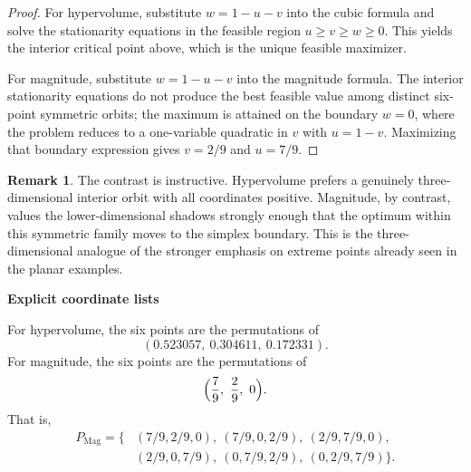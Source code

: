 \documentclass{article}
\theoremstyle{definition}
\newtheorem{remark}[theorem]{Remark}
\newcommand{\1}{\mathbf{1}}
\newcommand{\myparagraph}[1]{\medskip\noindent\textbf{#1}}
\begin{document}
\begin{proof}
For hypervolume, substitute $w=1-u-v$ into the cubic formula and solve the stationarity equations in the feasible region $u\ge v\ge w\ge 0$. This yields the interior critical point above, which is the unique feasible maximizer.

For magnitude, substitute $w=1-u-v$ into the magnitude formula. The interior stationarity equations do not produce the best feasible value among distinct six-point symmetric orbits; the maximum is attained on the boundary $w=0$, where the problem reduces to a one-variable quadratic in $v$ with $u=1-v$. Maximizing that boundary expression gives $v=2/9$ and $u=7/9$.
\end{proof}

\begin{remark}
The contrast is instructive. Hypervolume prefers a genuinely three-dimensional interior orbit with all coordinates positive. Magnitude, by contrast, values the lower-dimensional shadows strongly enough that the optimum within this symmetric family moves to the simplex boundary. This is the three-dimensional analogue of the stronger emphasis on extreme points already seen in the planar examples.
\end{remark}

\myparagraph{Explicit coordinate lists}

For hypervolume, the six points are the permutations of
\[
(0.523057,\ 0.304611,\ 0.172331).
\]
For magnitude, the six points are the permutations of
\[
\Bigl(\frac79,\ \frac29,\ 0\Bigr).
\]
That is,
\[
\begin{aligned}
P_{\mathrm{Mag}}=\{&
(7/9,2/9,0),\ (7/9,0,2/9),\ (2/9,7/9,0),\\
&(2/9,0,7/9),\ (0,7/9,2/9),\ (0,2/9,7/9)\}.
\end{aligned}
\]
\end{document}

